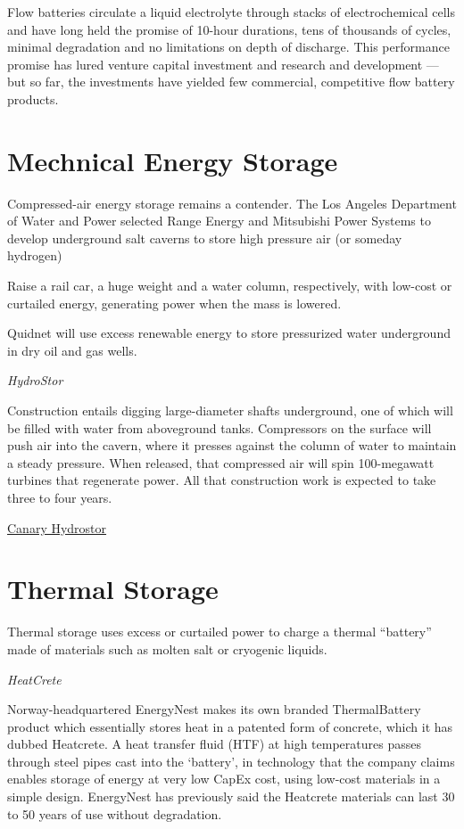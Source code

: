 \documentclass[
]{book}
\begin{document}
Flow batteries circulate a liquid electrolyte through stacks of electrochemical cells and have long held the promise of 10-hour durations, tens of thousands of cycles, minimal degradation and no limitations on depth of discharge. This performance promise has lured venture capital investment and research and development --- but so far, the investments have yielded few commercial, competitive flow battery products.

\hypertarget{mechnical-energy-storage}{%
\section{Mechnical Energy Storage}\label{mechnical-energy-storage}}

Compressed-air energy storage remains a contender. The Los Angeles Department of Water and Power selected Range Energy and Mitsubishi Power Systems to develop underground salt caverns to store high pressure air (or someday hydrogen)

Raise a rail car, a huge weight and a water column, respectively, with low-cost or curtailed energy, generating power when the mass is lowered.

Quidnet will use excess renewable energy to store pressurized water underground in dry oil and gas wells.

\emph{HydroStor}

Construction entails digging large-diameter shafts underground, one of which will be filled with water from aboveground tanks. Compressors on the surface will push air into the cavern, where it presses against the column of water to maintain a steady pressure. When released, that compressed air will spin 100-megawatt turbines that regenerate power. All that construction work is expected to take three to four years.

\href{https://www.canarymedia.com/articles/hydrostor-is-developing-truly-massive-grid-storage-in-watery-caverns/}{Canary Hydrostor}

\hypertarget{thermal-storage}{%
\section{Thermal Storage}\label{thermal-storage}}

Thermal storage uses excess or curtailed power to charge a thermal ``battery'' made of materials such as molten salt or cryogenic liquids.

\emph{HeatCrete}

Norway-headquartered EnergyNest makes its own branded ThermalBattery product which essentially stores heat in a patented form of concrete, which it has dubbed Heatcrete. A heat transfer fluid (HTF) at high temperatures passes through steel pipes cast into the `battery', in technology that the company claims enables storage of energy at very low CapEx cost, using low-cost materials in a simple design. EnergyNest has previously said the Heatcrete materials can last 30 to 50 years of use without degradation.
\end{document}
